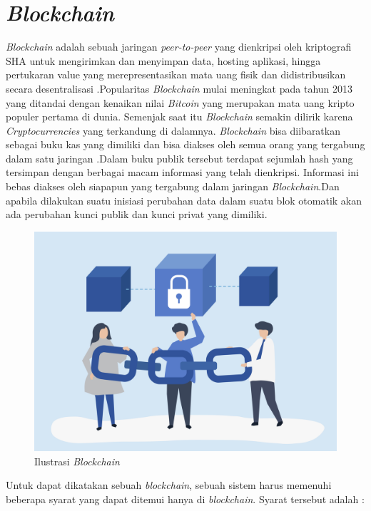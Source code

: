 \section{\emph{Blockchain}}
\label{sec:blockchain}

\emph{Blockchain} adalah sebuah jaringan \emph{peer-to-peer} yang dienkripsi oleh kriptografi SHA untuk mengirimkan dan menyimpan data, hosting aplikasi, hingga pertukaran value yang merepresentasikan mata uang fisik dan didistribusikan secara desentralisasi \cite{bookethsol}.Popularitas \emph{Blockchain} mulai meningkat pada tahun 2013 yang ditandai dengan kenaikan nilai \emph{Bitcoin} yang merupakan mata uang kripto populer pertama di dunia. Semenjak saat itu \emph{Blockchain} semakin dilirik karena \emph{Cryptocurrencies} yang terkandung di dalamnya. \emph{Blockchain} bisa diibaratkan sebagai buku kas yang dimiliki dan bisa diakses oleh semua orang yang tergabung dalam satu jaringan \cite{8701371}.Dalam buku publik tersebut terdapat sejumlah hash yang tersimpan dengan berbagai macam informasi yang telah dienkripsi. Informasi ini bebas diakses oleh siapapun yang tergabung dalam jaringan \emph{Blockchain}.Dan apabila dilakukan suatu inisiasi perubahan data dalam suatu blok otomatik akan ada perubahan kunci publik dan kunci privat yang dimiliki.

\begin{figure}[htp]
  \centering
  \includegraphics[scale=0.2]{gambar/blockchain-illustrated.jpg}
  \caption{Ilustrasi \emph{Blockchain}}
  \label{fig:blockchainillustrated}
\end{figure}

Untuk dapat dikatakan sebuah \emph{blockchain}, sebuah sistem harus memenuhi beberapa syarat yang dapat ditemui hanya di \emph{blockchain}. Syarat tersebut adalah :

